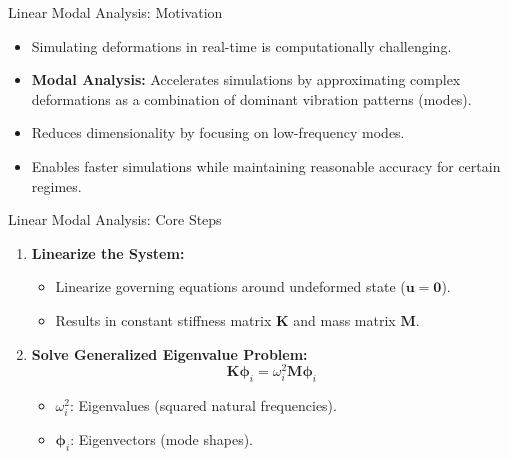 \documentclass{beamer}
\begin{document}
\begin{frame}{Linear Modal Analysis: Motivation}
    \begin{itemize}
        \item Simulating deformations in real-time is computationally challenging.
        \item \textbf{Modal Analysis:} Accelerates simulations by approximating complex deformations as a combination of dominant vibration patterns (modes).
        \item Reduces dimensionality by focusing on low-frequency modes.
        \item Enables faster simulations while maintaining reasonable accuracy for certain regimes.
    \end{itemize}
\end{frame}

\begin{frame}{Linear Modal Analysis: Core Steps}
    \begin{enumerate}
        \item \textbf{Linearize the System:}
        \begin{itemize}
            \item Linearize governing equations around undeformed state (\(\bm{u}=\bm{0}\)).
            \item Results in constant stiffness matrix \(\bm{K}\) and mass matrix \(\bm{M}\).
        \end{itemize}
        \item \textbf{Solve Generalized Eigenvalue Problem:}
        \begin{equation*}
            \bm{K} \bm{\phi}_i = \omega_i^2 \bm{M} \bm{\phi}_i
        \end{equation*}
        \begin{itemize}
            \item \(\omega_i^2\): Eigenvalues (squared natural frequencies).
            \item \(\bm{\phi}_i\): Eigenvectors (mode shapes).
        \end{itemize}
    \end{enumerate}
\end{frame}
\end{document}
